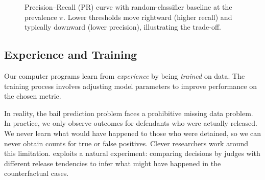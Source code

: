 \begin{figure}[H]
\centering
\caption{Precision--Recall (PR) curve with random-classifier baseline at the prevalence $\pi$. Lower thresholds move rightward (higher recall) and typically downward (lower precision), illustrating the trade-off.}
\label{fig:pr-curve}
\end{figure}



\subsection{Experience and Training}

Our computer programs learn from \textit{experience} by being \textit{trained} on data. The training process involves adjusting model parameters to improve performance on the chosen metric.

In reality, the bail prediction problem faces a prohibitive missing data problem. In practice, we only observe outcomes for defendants who were actually released. We never learn what would have happened to those who were detained, so we can never obtain counts for true or false positives. Clever researchers work around this limitation. \cite{kleinberg2018human} exploits a natural experiment: comparing decisions by judges with different release tendencies to infer what might have happened in the counterfactual cases.

